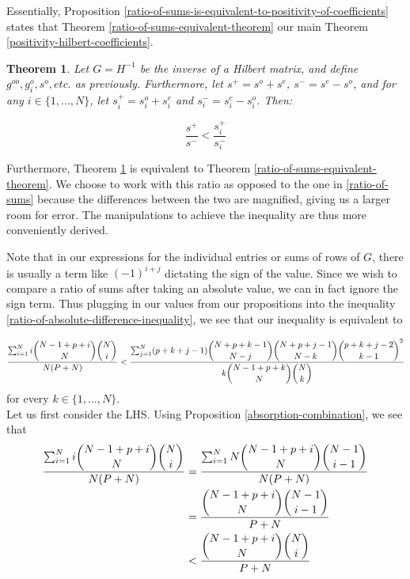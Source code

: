 \documentclass[11pt]{article}
\newtheorem{thm}{Theorem}[section]
\theoremstyle{definition}
\theoremstyle{remark}
\numberwithin{equation}{section}
\begin{document}
Essentially, Proposition \ref{ratio-of-sums-is-equivalent-to-positivity-of-coefficients} states that Theorem \ref{ratio-of-sums-equivalent-theorem} our main Theorem \ref{positivity-hilbert-coefficients}.

\begin{thm}\label{ratio-of-absolute-difference-theorem}
Let $G=H^{-1}$ be the inverse of a Hilbert matrix, and define $g^{oo}, g_i^o, s^o, etc.$ as previously. Furthermore, let $s^+ = s^o + s^e$, $s^- = s^e-s^o$, and for any $i\in \{1,...,N\}$, let $s_i^+ = s_i^o + s_i^e$ and $s_i^- = s_i^e- s_i^o$. Then:

\begin{equation}\label{ratio-of-absolute-difference-inequality}
\frac{s^+}{s^-} < \frac{s_i^+}{s_i^-}
\end{equation}
\end{thm} Furthermore, Theorem \ref{ratio-of-absolute-difference-theorem} is equivalent to Theorem \ref{ratio-of-sums-equivalent-theorem}. We choose to work with this ratio as opposed to the one in \ref{ratio-of-sums} because the differences between the two are magnified, giving us a larger room for error. The manipulations to achieve the inequality are thus more conveniently derived. 

Note that in our expressions for the individual entries or sums of rows of $G$, there is usually a term like $(-1)^{i+j}$ dictating the sign of the value. Since we wish to compare a ratio of sums after taking an absolute value, we can in fact ignore the sign term. Thus plugging in our values from our propositions into the inequality \ref{ratio-of-absolute-difference-inequality}, we see that our inequality is equivalent to 

\begin{equation}\label{inequality-all-expressions}
\frac{\sum_{i=1}^N i \dbinom{N-1+p+i}{N} \dbinom{N}{i}}{N(P+N)} < \frac{\sum_{j=1}^N (p+k+j-1) \dbinom{N+p+k-1}{N-j} \dbinom{N+p+j-1}{N-k} \dbinom{p+k+j-2}{k-1}^2 }{k \dbinom{N-1+p+k}{N}\dbinom{N}{k}} 
\end{equation}  for every $k\in \{ 1,...,N\}$.\\

Let us first consider the LHS. Using Proposition \ref{absorption-combination}, we see that 
\begin{align}
\frac{\sum_{i=1}^N i \dbinom{N-1+p+i}{N} \dbinom{N}{i}}{N(P+N)}  &= \frac{\sum_{i=1}^N N \dbinom{N-1+p+i}{N}  \dbinom{N-1}{i-1}}{N(P+N)} \\
&= \frac{\dbinom{N-1+p+i}{N}  \dbinom{N-1}{i-1}}{P+N} \\
&< \frac{\dbinom{N-1+p+i}{N}  \dbinom{N}{i}}{P+N} \label{LHS-upper-bound}
\end{align}
\end{document}
